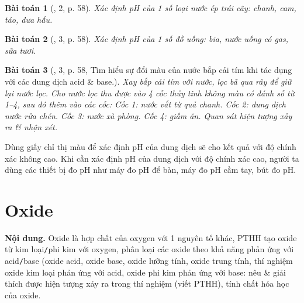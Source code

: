 \documentclass{article}
\newtheorem{baitoan}{Bài toán}
\begin{document}
\begin{baitoan}[\cite{SGK_KHTN_8_Canh_Dieu}, 2, p. 58]
	Xác định pH của 1 số loại nước ép trái cây: chanh, cam, táo, dưa hấu.
\end{baitoan}

\begin{baitoan}[\cite{SGK_KHTN_8_Canh_Dieu}, 3, p. 58]
	Xác định pH của 1 số đồ uống: bia, nước uống có gas, sữa tươi.
\end{baitoan}

\begin{baitoan}[\cite{SGK_KHTN_8_Canh_Dieu}, 3, p. 58, Tìm hiểu sự đổi màu của nước bắp cải tím khi tác dụng với các dung dịch acid \& base.]
	Xay bắp cải tím với nước, lọc bã qua rây để giữ lại nước lọc. Cho nước lọc thu được vào 4 cốc thủy tinh không màu có đánh số từ 1--4, sau đó thêm vào các cốc: Cốc 1: nước vắt từ quả chanh. Cốc 2: dung dịch nước rửa chén. Cốc 3: nước xà phòng. Cốc 4: giấm ăn. Quan sát hiện tượng xảy ra \& nhận xét.
\end{baitoan}
Dùng giấy chỉ thị màu để xác định pH của dung dịch sẽ cho kết quả với độ chính xác không cao. Khi cần xác định pH của dung dịch với độ chính xác cao, người ta dùng các thiết bị đo pH như máy đo pH để bàn, máy đo pH cầm tay, bút đo pH.

\noindent{}


\section{Oxide}
\textsf{\textbf{Nội dung.} Oxide là hợp chất của oxygen với 1 nguyên tố khác, PTHH tạo oxide từ kim loại\texttt{/}phi kim với oxygen, phân loại các oxide theo khả năng phản ứng với acid\texttt{/}base (oxide acid, oxide base, oxide lưỡng tính, oxide trung tính, thí nghiệm oxide kim loại phản ứng với acid, oxide phi kim phản ứng với base: nêu \& giải thích được hiện tượng xảy ra trong thí nghiệm (viết PTHH), tính chất hóa học của oxide.}
\end{document}

